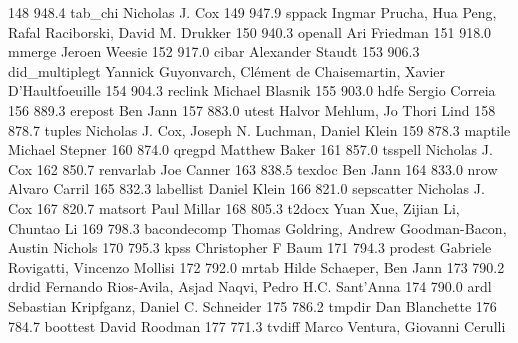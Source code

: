    148    948.4    tab_chi       Nicholas J. Cox                         
   149    947.9    sppack        Ingmar Prucha, Hua Peng, Rafal          
                                   Raciborski, David M. Drukker            
   150    940.3    openall       Ari Friedman                            
   151    918.0    mmerge        Jeroen Weesie                           
   152    917.0    cibar         Alexander Staudt                        
   153    906.3    did_multiplegt  Yannick Guyonvarch, Clément de         
                                   Chaisemartin, Xavier D'Haultfoeuille    
   154    904.3    reclink       Michael Blasnik                         
   155    903.0    hdfe          Sergio Correia                          
   156    889.3    erepost       Ben Jann                                
   157    883.0    utest         Halvor Mehlum, Jo Thori Lind            
   158    878.7    tuples        Nicholas J. Cox, Joseph N. Luchman,     
                                   Daniel Klein                            
   159    878.3    maptile       Michael Stepner                         
   160    874.0    qregpd        Matthew Baker                           
   161    857.0    tsspell       Nicholas J. Cox                         
   162    850.7    renvarlab     Joe Canner                              
   163    838.5    texdoc        Ben Jann                                
   164    833.0    nrow          Alvaro Carril                           
   165    832.3    labellist     Daniel Klein                            
   166    821.0    sepscatter    Nicholas J. Cox                         
   167    820.7    matsort       Paul Millar                             
   168    805.3    t2docx        Yuan Xue, Zijian Li, Chuntao Li         
   169    798.3    bacondecomp   Thomas Goldring, Andrew Goodman-Bacon,  
                                   Austin Nichols                          
   170    795.3    kpss          Christopher F Baum                      
   171    794.3    prodest       Gabriele Rovigatti, Vincenzo Mollisi    
   172    792.0    mrtab         Hilde Schaeper, Ben Jann                
   173    790.2    drdid         Fernando Rios-Avila, Asjad Naqvi, Pedro 
                                   H.C. Sant'Anna                          
   174    790.0    ardl          Sebastian Kripfganz, Daniel C. Schneider
   175    786.2    tmpdir        Dan Blanchette                          
   176    784.7    boottest      David Roodman                           
   177    771.3    tvdiff        Marco Ventura, Giovanni Cerulli         
